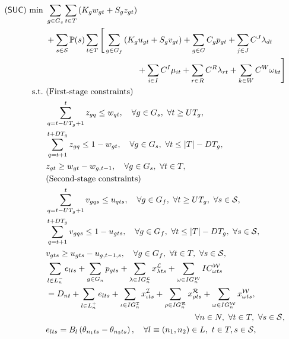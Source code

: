 \begin{subequations} \label{SUC:formulation}
	\begin{align}
	(\suc)\ \textrm{min}\ &\sum_{g\in G_s}\sum_{t \in T}\left(K_g w_{gt}+S_g z_{gt}\right) \nonumber \\	&+ \sum_{s\in\mathcal{S}}\PP(s)\sum_{t\in T} 
	\Bigg[	 \sum_{g\in G_f} \left(K_g u_{gt}+S_g v_{gt}\right) + \sum_{g\in G}C_g p_{gt} + \sum_{j\in J} C^{J}\lambda_{dt} \nonumber \\&\qquad\qquad\qquad\qquad\qquad\quad  + \sum_{i\in I} C^{I}\mu_{it} + \sum_{r\in R} C^{R}\lambda_{rt} + \sum_{k\in W} C^{W}\omega_{kt} \Bigg]
	\label{SUC:obj}\\
	\textrm{s.t.}\ &  \textrm{(First-stage constraints)} \nonumber\\
	&\sum_{q=t-UT_g+1}^t z_{gq}\le w_{qt},\quad\forall g\in G_s,\ \forall t\ge UT_g,	\label{SUC:b}\\
	&\sum_{q=t+1}^{t+DT_g} z_{gq}\le 1-w_{gt},\quad\forall g\in G_s,\ \forall t\le |T|-DT_g,\label{SUC:c}\\
	&z_{gt}\ge w_{gt}-w_{g,t-1},\quad\forall g\in G_s,\ \forall t\in T,\label{SUC:d}\\
	&  \textrm{(Second-stage constraints)} \nonumber\\
	&  \sum_{q=t-UT_g+1}^t v_{gqs}\le u_{qts},\quad\forall g\in G_f,\ \forall t\ge UT_g,\ \forall s\in\mathcal{S},\label{SUC:e}\\
	&\sum_{q=t+1}^{t+DT_g} v_{gqs}\le 1-u_{gts},\quad\forall g\in G_f,\ \forall t\le |T|-DT_g,\ \forall s\in\mathcal{S},\label{SUC:f}\\
	&v_{gts}\ge u_{gts}-u_{g,t-1,s},\quad\forall g\in G_f,\ \forall t\in T,\ \forall s\in\mathcal{S},\label{SUC:g}\\
	&\sum_{l\in L_n^-}e_{lts}+\sum_{g\in G_n} p_{gts}+\sum_{\lambda\in IG_n^\mathcal{L}}x_{\lambda ts}^\mathcal{L} +\sum_{\omega\in IG_n^\mathcal{W}} IC_{\omega ts}^\mathcal{W} \nonumber \\ 
	&= D_{nt}+\sum_{l\in L_n^+}e_{lts}+\sum_{\iota\in IG_n^\mathcal{I}}x_{\iota ts}^\mathcal{I} + \sum_{\rho\in IG_n^\mathcal{R}} x_{\rho ts}^\mathcal{R} +\sum_{\omega\in IG_n^\mathcal{W}} x_{\omega ts}^\mathcal{W}, \nonumber \\
	&\qquad\qquad\qquad\qquad\qquad\qquad\qquad\qquad\qquad\forall n\in N,\ \forall t\in T,\ \forall s\in\mathcal{S},\label{SUC:h}\\
	&e_{lts}=B_l\left(  \theta_{n_1 ts}-\theta_{n_2 ts}  \right),\quad\forall l\equiv (n_1, n_2)\in L,\ t\in T, s\in\mathcal{S},\label{SUC:i}\\

\end{align}
\end{subequations}
